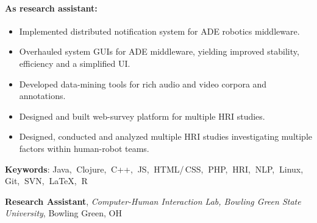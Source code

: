 \documentclass[10pt, letter]{article}
\newcommand{\years}[1]{\marginnote{\footnotesize #1}}
\newenvironment{desc*}{
  \begin{description}
    \setlength{\itemsep}{0.2pt}
    \setlength{\parskip}{-1pt}
    \setlength{\parsep}{0pt}
  }{
  \end{description}
}
\begin{document}
\paragraph{\textbf{As research assistant:}}
\begin{itemize}[leftmargin=*, parsep=-1pt]
\item Implemented distributed notification system for ADE robotics
  middleware. 
\item Overhauled system GUIs for ADE middleware, yielding improved
  stability, efficiency and a simplified UI. 
\item Developed data-mining tools for rich audio and video corpora and annotations. 
\item Designed and built web-survey platform for multiple HRI studies. 
\item Designed, conducted and analyzed multiple HRI studies
  investigating multiple factors within human-robot teams.
\end{itemize}
\vspace{-.2cm}
\begin{desc*}
\item[\rm \color{redblue} \textbf{Keywords}:] Java,$\:$ Clojure,$\:$ C++,$\:$
  JS,$\:$ HTML/\,CSS,$\:$ PHP,$\:$ HRI,$\:$ NLP,$\:$ Linux,$\:$ Git,$\:$ SVN,$\:$ \LaTeX,$\:$ R\\
\end{desc*}

\vspace{-.2cm}
\years{2010 - 2012}
\textbf{\fontsize{10.5pt}{1em}\selectfont Research Assistant}, 
\textit{Computer-Human Interaction Lab, Bowling Green State
  University}, Bowling Green, OH \\
\end{document}
